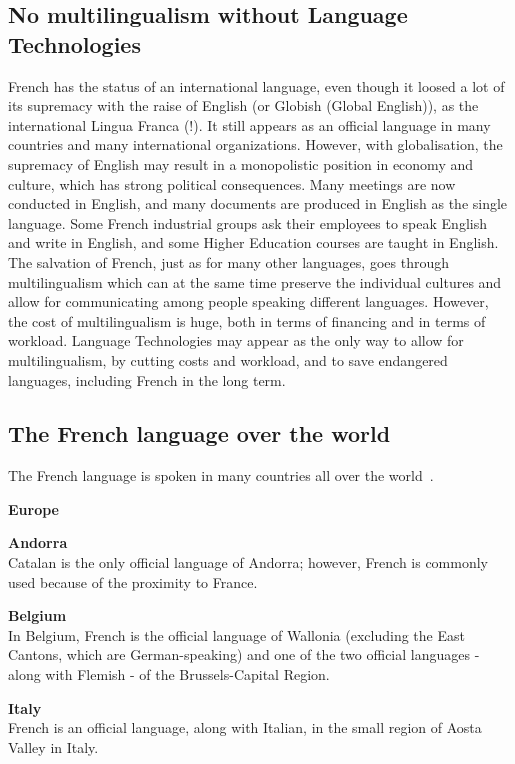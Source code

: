 \begin{multicols}{2}
\subsection{No multilingualism without Language Technologies}

French has the status of an international language, even though it
loosed a lot of its supremacy with the raise of English (or Globish
(Global English)), as the international Lingua Franca (!). It still
appears as an official language in many countries and many
international organizations. However, with globalisation, the
supremacy of English may result in a monopolistic position in economy
and culture, which has strong political consequences. Many meetings
are now conducted in English, and many documents are produced in
English as the single language. Some French industrial groups ask
their employees to speak English and write in English, and some Higher
Education courses are taught in English. The salvation of French, just
as for many other languages, goes through multilingualism which can at
the same time preserve the individual cultures and allow for
communicating among people speaking different languages. However, the
cost of multilingualism is huge, both in terms of financing and in
terms of workload. Language Technologies may appear as the only way to
allow for multilingualism, by cutting costs and workload, and to save
endangered languages, including French in the long term.

\subsection{The French language over the world}
\label{frenchLanguageInTheWorldEn}
The French language is spoken in many countries all over the world~\cite{francaisautourmonde}.
\begin{center}
{\bf {\sc Europe}}
\end{center}

{\bf Andorra}\\
Catalan is the only official language of Andorra; however, French is
commonly used because of the proximity to France.

{\bf Belgium}\\ 
In Belgium, French is the official language of Wallonia (excluding the
East Cantons, which are German-speaking) and one of the two official
languages - along with Flemish - of the Brussels-Capital Region.

{\bf Italy}\\
French is an official language, along with Italian, in the small region of Aosta Valley in Italy.


\end{multicols}
